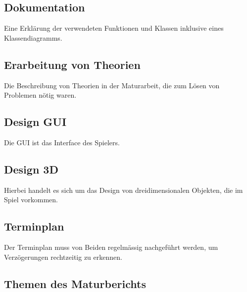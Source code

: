 \documentclass[a4paper]{article}
\begin{document}

\subsection{Dokumentation}

Eine Erklärung der verwendeten Funktionen und Klassen inklusive eines Klassendiagramms.


\subsection{Erarbeitung von Theorien}
Die Beschreibung von Theorien in der Maturarbeit, die zum Lösen von Problemen nötig waren. 


\subsection{Design GUI}
Die GUI ist das Interface des Spielers.


\subsection{Design 3D}
Hierbei handelt es sich um das Design von dreidimensionalen Objekten, die im Spiel vorkommen.


\subsection{Terminplan}
Der Terminplan muss von Beiden regelmässig nachgeführt werden, um Verzögerungen rechtzeitig zu erkennen.


\subsection{Themen des Maturberichts}
\end{document}
